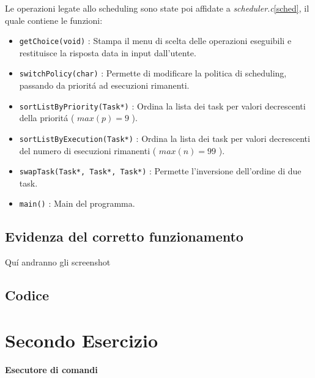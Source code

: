 \documentclass[a4paper]{article}
\begin{document}
Le operazioni legate allo scheduling sono state poi affidate a \textit{scheduler.c}\ref{sched}, il quale contiene le funzioni:

\begin{itemize}
\item \texttt{getChoice(void)} : Stampa il menu di scelta delle operazioni eseguibili e restituisce la risposta data in input dall'utente.

\item \texttt{switchPolicy(char)} : Permette di modificare la politica di scheduling, passando da priorit\'a ad esecuzioni rimanenti.

\item \texttt{sortListByPriority(Task*)} : Ordina la lista dei task per valori decrescenti della priorit\'a ( $max(p)=9$ ).

\item \texttt{sortListByExecution(Task*)} : Ordina la lista dei task per valori decrescenti del numero di esecuzioni rimanenti ( $max(n)=99$ ).

\item \texttt{swapTask(Task*, Task*, Task*)} : Permette l'inversione dell'ordine di due task.

\item \texttt{main()} : Main del programma.
\end{itemize}

\subsection{Evidenza del corretto funzionamento}
Qu\'i andranno gli screenshot
\subsection{Codice}




\newpage
\section{Secondo Esercizio}
\textbf{Esecutore di comandi}
\end{document}
